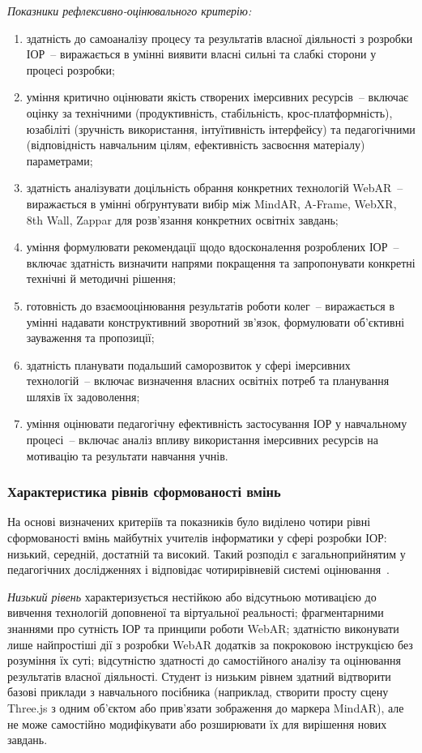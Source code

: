 \textit{Показники рефлексивно-оцінювального критерію:}
\begin{enumerate}
\item здатність до самоаналізу процесу та результатів власної діяльності з розробки ІОР~-- виражається в умінні виявити власні сильні та слабкі сторони у процесі розробки;
\item уміння критично оцінювати якість створених імерсивних ресурсів~-- включає оцінку за технічними (продуктивність, стабільність, крос-платформність), юзабіліті (зручність використання, інтуїтивність інтерфейсу) та педагогічними (відповідність навчальним цілям, ефективність засвоєння матеріалу) параметрами;
\item здатність аналізувати доцільність обрання конкретних технологій WebAR~-- виражається в умінні обґрунтувати вибір між MindAR, A-Frame, WebXR, 8th Wall, Zappar для розв'язання конкретних освітніх завдань;
\item уміння формулювати рекомендації щодо вдосконалення розроблених ІОР~-- включає здатність визначити напрями покращення та запропонувати конкретні технічні й методичні рішення;
\item готовність до взаємооцінювання результатів роботи колег~-- виражається в умінні надавати конструктивний зворотний зв'язок, формулювати об'єктивні зауваження та пропозиції;
\item здатність планувати подальший саморозвиток у сфері імерсивних технологій~-- включає визначення власних освітніх потреб та планування шляхів їх задоволення;
\item уміння оцінювати педагогічну ефективність застосування ІОР у навчальному процесі~-- включає аналіз впливу використання імерсивних ресурсів на мотивацію та результати навчання учнів.
\end{enumerate}

\subsubsection{Характеристика рівнів сформованості вмінь}

На основі визначених критеріїв та показників було виділено чотири рівні сформованості вмінь майбутніх учителів інформатики у сфері розробки ІОР: низький, середній, достатній та високий. Такий розподіл є загальноприйнятим у педагогічних дослідженнях і відповідає чотирирівневій системі оцінювання~\cite{Fitsula2006Pedagogics}.

\textit{Низький рівень} характеризується нестійкою або відсутньою мотивацією до вивчення технологій доповненої та віртуальної реальності; фрагментарними знаннями про сутність ІОР та принципи роботи WebAR; здатністю виконувати лише найпростіші дії з розробки WebAR додатків за покроковою інструкцією без розуміння їх суті; відсутністю здатності до самостійного аналізу та оцінювання результатів власної діяльності. Студент із низьким рівнем здатний відтворити базові приклади з навчального посібника (наприклад, створити просту сцену Three.js з одним об'єктом або прив'язати зображення до маркера MindAR), але не може самостійно модифікувати або розширювати їх для вирішення нових завдань.

